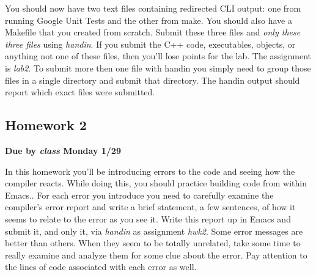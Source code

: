 \documentclass[nobib]{tufte-handout}
\begin{document}
You should now have two text files containing redirected CLI output: one from running Google Unit Tests and the other from make. You should also have a Makefile that you created from scratch. Submit these three files and \textit{only these three files} using \textit{handin}. If you submit the C++ code, executables, objects, or anything not one of these files, then you'll lose points for the lab. The assignment is \textit{lab2}. To submit more then one file with handin you simply need to group those files in a single directory and submit that directory. The handin output should report which exact files were submitted.

\subsection{Homework 2}

\begin{center}
\textbf{Due by \textit{class} Monday 1/29}
\end{center}

In this homework you'll be introducing errors to the code and seeing how the compiler reacts. While doing this, you should practice building code from within Emacs.. For each error you introduce you need to carefully examine the compiler's error report and write a brief statement, a few sentences, of how it seems to relate to the error as you see it.  Write this report up in Emacs and submit it, and only it, via \textit{handin} as assignment \textit{hwk2}.  Some error messages are better than others. When they seem to be totally unrelated, take some time to really examine and analyze them for some clue about the error.  Pay attention to the lines of code associated with each error as well.
\end{document}
